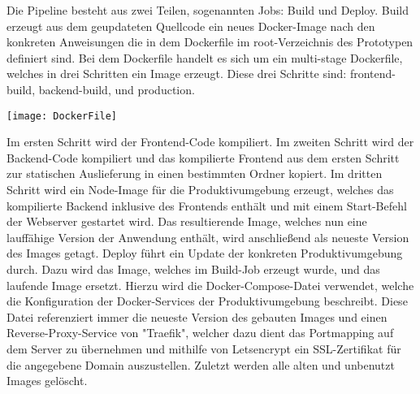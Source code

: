 Die Pipeline besteht aus zwei Teilen, sogenannten Jobs: Build und Deploy.
Build erzeugt aus dem geupdateten Quellcode ein neues Docker-Image nach den konkreten Anweisungen die in dem Dockerfile im root-Verzeichnis des Prototypen definiert sind. Bei dem Dockerfile handelt es sich um ein multi-stage Dockerfile, welches in drei Schritten ein Image erzeugt. Diese drei Schritte sind:
frontend-build, backend-build, und production.

\vspace{20pt}
\begin{center}
    \begin{minipage}{1\linewidth}
        \texttt{[image: DockerFile]}
    \end{minipage}
\end{center}
\vspace{20pt}

Im ersten Schritt wird der Frontend-Code kompiliert. Im zweiten Schritt wird der Backend-Code kompiliert und das kompilierte Frontend aus dem ersten Schritt zur statischen Auslieferung in einen bestimmten Ordner kopiert. Im dritten Schritt wird ein Node-Image für die Produktivumgebung erzeugt, welches das kompilierte Backend inklusive des Frontends enthält und mit einem Start-Befehl der Webserver gestartet wird.
Das resultierende Image, welches nun eine lauffähige Version der Anwendung enthält, wird anschließend als neueste Version des Images getagt.
Deploy führt ein Update der konkreten Produktivumgebung durch. Dazu wird das Image, welches im Build-Job erzeugt wurde, und das laufende Image ersetzt. Hierzu wird die Docker-Compose-Datei verwendet, welche die Konfiguration der Docker-Services der Produktivumgebung beschreibt. Diese Datei referenziert immer die neueste Version des gebauten Images und einen Reverse-Proxy-Service von "Traefik", welcher dazu dient das Portmapping auf dem Server zu übernehmen und mithilfe von Letsencrypt ein SSL-Zertifikat für die angegebene Domain auszustellen.
Zuletzt werden alle alten und unbenutzt Images gelöscht.